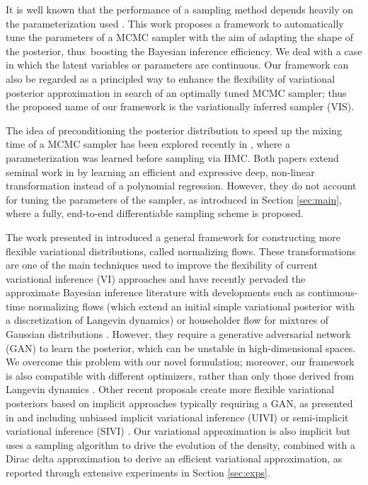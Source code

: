 It is well known that the performance of a sampling method depends
heavily on the parameterization used \cite{papaspiliopoulos2007general}. This work proposes
a framework to automatically tune the parameters of a 
MCMC sampler {with the aim of adapting the shape of the posterior, thus~boosting the Bayesian inference efficiency. 
 We deal with a case in which the latent variables or parameters are continuous. Our framework can also be regarded as a principled way to enhance the flexibility of  variational posterior approximation in search of an optimally tuned MCMC sampler;} thus the proposed name of our framework is {the variationally inferred sampler} (VIS).


{

The idea of preconditioning the posterior distribution to speed up the mixing time of a MCMC sampler has been explored recently in \cite{hoffmanneutra,PhysRevLett.121.260601}, where a parameterization was learned before sampling via HMC. Both papers extend seminal work in \cite{parno2014transport} by learning an efficient and expressive deep, non-linear transformation instead of a polynomial regression. However, they do not account for tuning the parameters of the sampler, as introduced in Section \ref{sec:main}, where a fully, end-to-end differentiable sampling scheme is proposed.

The work presented in \cite{rezende2015variational} introduced a general
framework for constructing more flexible variational distributions, called normalizing flows. These transformations are one of the main techniques used to improve the flexibility of current variational inference (VI) approaches and have recently pervaded the approximate Bayesian inference
literature with developments such as continuous-time normalizing flows \cite{chen2018continuoustime} (which extend an initial simple variational posterior with a discretization of Langevin dynamics) or householder flow for mixtures of Gaussian distributions \cite{LIU201943}. However, they require a generative adversarial network (GAN) \cite{goodfellow2014generative} to learn the posterior,
which can be unstable in high-dimensional spaces. We overcome this problem with our novel formulation; moreover, our framework is also compatible with different optimizers, rather than only those derived from Langevin dynamics \cite{10.5555/3122009.3208015}. Other recent proposals create more flexible variational posteriors based on implicit approaches typically requiring a GAN, as presented in \cite{huszar2017variational} and including unbiased implicit variational inference (UIVI)
\cite{pmlr-v89-titsias19a} or semi-implicit variational inference (SIVI) \cite{yin2018semi}. Our variational approximation is also implicit but uses a sampling algorithm to drive the evolution of the density, combined with a Dirac delta approximation to derive an efficient variational approximation, as reported through extensive experiments in Section \ref{sec:exps}.

}
